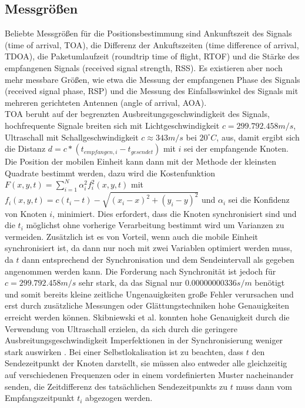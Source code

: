 \subsection{Messgrößen}
Beliebte Messgrößen für die Positionsbestimmung sind Ankunftszeit des Signals (time of arrival, TOA), die Differenz der Ankuftszeiten (time difference of arrival, TDOA), die Paketumlaufzeit (roundtrip time of flight, RTOF) und die Stärke des empfangenen Signals (received signal strength, RSS). Es existieren aber noch mehr messbare Größen, wie etwa die Messung der empfangenen Phase des Signals (received signal phase, RSP) und die Messung des Einfallsswinkel des Signals mit mehreren gerichteten Antennen (angle of arrival, AOA). \\
TOA beruht auf der begrenzten Ausbreitungsgeschwindigkeit des Signals, hochfrequente Signale breiten sich mit Lichtgeschwindigkeit $c = 299.792.458m/s$, Ultraschall mit Schallgeschwindigkeit $c \approx 343m/s$ bei $20^{\circ}C$, aus, damit ergibt sich die Distanz $d = c*(t_{empfangen,i} - t_{gesendet})$ mit $i$ sei der empfangende Knoten. Die Position der mobilen Einheit kann dann mit der Methode der kleinsten Quadrate bestimmt werden, dazu wird die Kostenfunktion $F(x,y,t) = \sum_{i=1}^{N} {\alpha}^2_i f^2_i(x,y,t)$ mit $f_i(x,y,t) = c(t_i - t) - \sqrt{(x_i - x)^2 + (y_i - y)^2}$ und ${\alpha}_i$ sei die Konfidenz von Knoten $i$, minimiert. Dies erfordert, dass die Knoten synchronisiert sind und die $t_i$ möglichst ohne vorherige Verarbeitung bestimmt wird um Varianzen zu vermeiden. Zusätzlich ist es von Vorteil, wenn auch die mobile Einheit synchronisiert ist, da dann nur noch mit zwei Variablen optimiert werden muss, da $t$ dann entsprechend der Synchronisation und dem Sendeintervall als gegeben angenommen werden kann. Die Forderung nach Synchronität ist jedoch für $c = 299.792.458m/s$ sehr stark, da das Signal nur $0.00000000336 s/m$ benötigt und somit bereits kleine zeitliche Ungenauigkeiten große Fehler verursachen und erst durch zusätzliche Messungen oder Glättungstechniken hohe Genauigkeiten erreicht werden können. Skibniewski et al. konnten hohe Genauigkeit durch die Verwendung von Ultraschall erzielen, da sich durch die geringere Ausbreitungsgeschwindigkeit Imperfektionen in der Synchronisierung weniger stark auswirken \cite{skibniewski2009simulation}. 
Bei einer Selbstlokalisation ist zu beachten, dass $t$ den Sendezeitpunkt der Knoten darstellt, sie müssen also entweder alle gleichzeitig auf verschiedenen Frequenzen oder in einem vordefinierten Muster nacheinander senden, die Zeitdifferenz des tatsächlichen Sendezeitpunkts zu $t$ muss dann vom Empfangszeitpunkt $t_i$ abgezogen werden. \\
